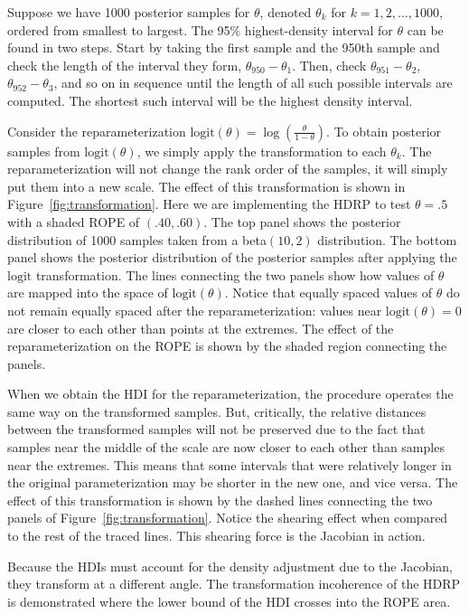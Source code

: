 \documentclass[man]{apa}
\newcommand{\hdr}{HDRP}
\newcommand{\logit}{\text{logit}}
\begin{document}
Suppose we have 1000 posterior samples for $\theta$, denoted $\theta_k$ for $k=1,2,\dots,1000$, ordered from smallest to largest. The 95\% highest-density interval for $\theta$ can be found in two steps. Start by taking the first sample and the 950th sample and check the length of the interval they form, $\theta_{950} - \theta_1$. Then, check $\theta_{951}-\theta_2$, $\theta_{952}-\theta_3$, and so on in sequence until the length of all such possible intervals are computed. The shortest such interval will be the highest density interval. 

Consider the reparameterization $\logit(\theta)=\log\left(\frac{\theta}{1-\theta}\right)$. To obtain posterior samples from $\text{logit}(\theta)$, we simply apply the transformation to each $\theta_k$. The reparameterization will not change the rank order of the samples, it will simply put them into a new scale. The effect of this transformation is shown in Figure~\ref{fig:transformation}. Here we are implementing the \hdr{} to test $\theta=.5$ with a shaded ROPE of $(.40, .60)$. The top panel shows the posterior distribution of 1000 samples taken from a beta$(10,2)$ distribution. The bottom panel shows the posterior distribution of the posterior samples after applying the $\logit$ transformation. The lines connecting the two panels show how values of $\theta$ are mapped into the space of $\logit(\theta)$. Notice that equally spaced values of $\theta$ do not remain equally spaced after the reparameterization: values near $\logit(\theta)=0$ are closer to each other than points at the extremes. The effect of the reparameterization on the ROPE is shown by the shaded region connecting the panels. 

When we obtain the HDI for the reparameterization, the procedure operates the same way on the transformed samples. But, critically, the relative distances between the transformed samples will not be preserved due to the fact that samples near the middle of the scale are now closer to each other than samples near the extremes. This means that some intervals that were relatively longer in the original parameterization may be shorter in the new one, and vice versa. The effect of this transformation is shown by the dashed lines connecting the two panels of Figure~\ref{fig:transformation}. Notice the shearing effect when compared to the rest of the traced lines. This shearing force is the Jacobian in action. 

Because the HDIs must account for the density adjustment due to the Jacobian, they transform at a different angle. The transformation incoherence of the \hdr{} is demonstrated where the lower bound of the HDI crosses into the ROPE area. 
\end{document}
